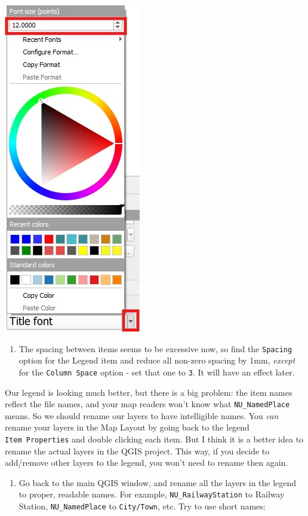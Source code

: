 \documentclass[
  letterpaper,
  DIV=11,
  numbers=noendperiod]{scrreprt}
\providecommand{\tightlist}{%
  \setlength{\itemsep}{0pt}\setlength{\parskip}{0pt}}\usepackage{longtable,booktabs,array}
\begin{document}
\includegraphics{images/lab_8/lab8_fig12_fontsize.jpg}

\begin{enumerate}
\def\labelenumi{(\arabic{enumi})}
\setcounter{enumi}{245}
\tightlist
\item
  The spacing between items seems to be excessive now, so find the
  \texttt{Spacing} option for the Legend item and reduce all non-zero
  spacing by 1mm, \emph{except} for the \texttt{Column\ Space} option -
  set that one to \texttt{3}. It will have an effect later.
\end{enumerate}

Our legend is looking much better, but there is a big problem: the item
names reflect the file names, and your map readers won't know what
\texttt{NU\_NamedPlace} means. So we should rename our layers to have
intelligible names. You \emph{can} rename your layers in the Map Layout
by going back to the legend \texttt{Item\ Properties} and double
clicking each item. But I think it is a better idea to rename the actual
layers in the QGIS project. This way, if you decide to add/remove other
layers to the legend, you won't need to rename then again.

\begin{enumerate}
\def\labelenumi{(\arabic{enumi})}
\setcounter{enumi}{246}
\tightlist
\item
  Go back to the main QGIS window, and rename all the layers in the
  legend to proper, readable names. For example,
  \texttt{NU\_RailwayStation} to Railway Station,
  \texttt{NU\_NamedPlace} to \texttt{City/Town}, etc. Try to use short
  names:
\end{enumerate}
\end{document}
